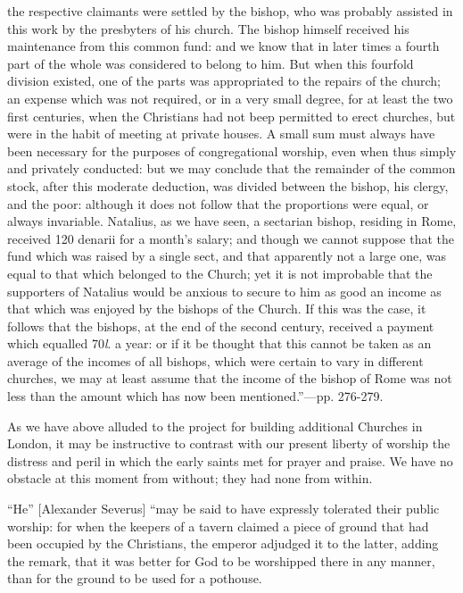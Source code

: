 the respective
claimants were settled by the bishop, who was probably assisted in this
work by the presbyters of his church. The bishop himself received his
maintenance from this common fund: and we know that in later times a
fourth part of the whole was considered to belong to him. But when this
fourfold division existed, one of the parts was appropriated to the
repairs of the church; an expense which was not required, or in a very
small degree, for at least the two first centuries, when the Christians
had not beep permitted to erect churches, but were in the habit of
meeting at private houses. A small sum must always have been necessary
for the purposes of congregational worship, even when thus simply and
privately conducted: but we may conclude that the remainder of the
common stock, after this moderate deduction, was divided between the
bishop, his clergy, and the poor: although it does not follow that the
proportions were equal, or always invariable. Natalius, as we have seen,
a sectarian bishop, residing in Rome, received 120 denarii for a
month's salary; and though we cannot suppose that the fund which was
raised by a single sect, and that apparently not a large one, was equal
to that which belonged to the Church; yet it is not improbable that the
supporters of Natalius would be anxious to secure to him as good an
income as that which was enjoyed by the bishops of the Church. If this
was the case, it follows that the bishops, at the end of the second
century, received a payment which equalled 70\emph{l}. a year: or if it
be thought that this cannot be taken as an average of the incomes of all
bishops, which were certain to vary in different churches, we may at
least assume that the income of the bishop of Rome was not less than the
amount which has now been mentioned.''—pp. 276-279.

As we have
above alluded to the project for building additional Churches in London,
it may be instructive to contrast with our present liberty of worship
the distress and peril in which the early saints met for prayer and
praise. We have no obstacle at this moment from without; they had none
from within.

``He''
[Alexander Severus] ``may be said to have expressly tolerated their
public worship: for when the keepers of a tavern claimed a piece of
ground that had been occupied by the Christians, the emperor adjudged it
to the latter, adding the remark, that it was better for God to be
worshipped there in any manner, than for the ground to be used for a
pothouse.

